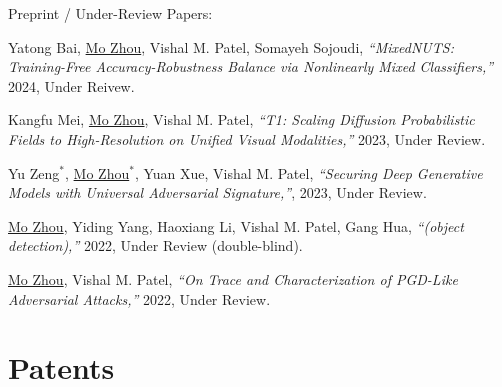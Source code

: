 \documentclass[10pt,margin,line,pifont,palatino,courier]{res}
\begin{document}
\begin{resume}
\begin{enumerate}[noitemsep, leftmargin=*, label={[C0{\arabic*}]}]
\end{enumerate}

	{\sc Preprint / Under-Review Papers:}\\

\begin{enumerate}[noitemsep, leftmargin=*, label={[X0{\arabic*}]}]


\item Yatong Bai, \underline{Mo Zhou}, Vishal M. Patel, Somayeh Sojoudi,
\reversemarginpar{}
\textit{``MixedNUTS: Training-Free Accuracy-Robustness Balance via Nonlinearly Mixed Classifiers,''}
2024, Under Reivew.

\item Kangfu Mei, \underline{Mo Zhou}, Vishal M. Patel,
\reversemarginpar{}
\textit{``T1: Scaling Diffusion Probabilistic Fields to High-Resolution on Unified Visual Modalities,''}
2023, Under Review.

\item Yu Zeng$^*$, \underline{Mo Zhou}$^*$, Yuan Xue, Vishal M. Patel,
\reversemarginpar{}
\textit{``Securing Deep Generative Models with Universal Adversarial Signature,''},
2023, Under Review.

\item \underline{Mo Zhou}, Yiding Yang, Haoxiang Li, Vishal M. Patel, Gang Hua,
\textit{``(object detection),''}
2022, Under Review (double-blind).

\item \underline{Mo Zhou}, Vishal M. Patel,
\reversemarginpar{}
\textit{``On Trace and Characterization of PGD-Like Adversarial Attacks,''}
2022, Under Review.

\end{enumerate}

\section{\sc Patents}


\end{resume}
\end{document}
